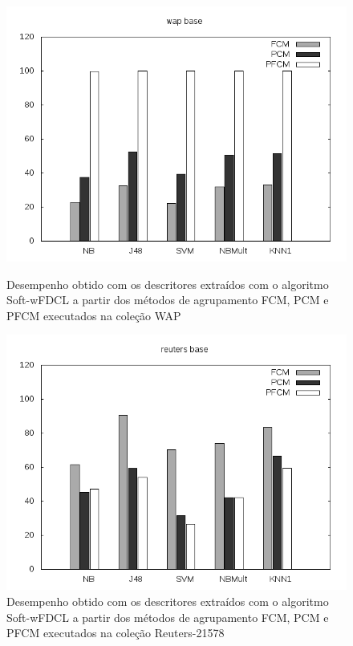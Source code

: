 \begin{figure}[!htp] \centering 
   \begin{minipage}{0.45\textwidth} 
     \centering
    \includegraphics[width=1.0\columnwidth]{assets/pfcm/wap} 
    \caption{Desempenho obtido com os descritores extraídos com o algoritmo Soft-wFDCL a partir dos
      métodos de agrupamento FCM,
    PCM e PFCM executados na coleção WAP} 
    \label{fig:pfcmwap}
  \end{minipage}\hfill 
  \begin{minipage}{0.45\textwidth} \centering
    \includegraphics[width=1.0\columnwidth]{assets/pfcm/reuters} 
    \caption{Desempenho obtido com os descritores extraídos com o algoritmo Soft-wFDCL a partir dos
      métodos de agrupamento FCM,
    PCM e PFCM executados na coleção Reuters-21578} 
     \label{fig:pfcmreuters} 
   \end{minipage} 
\end{figure}

